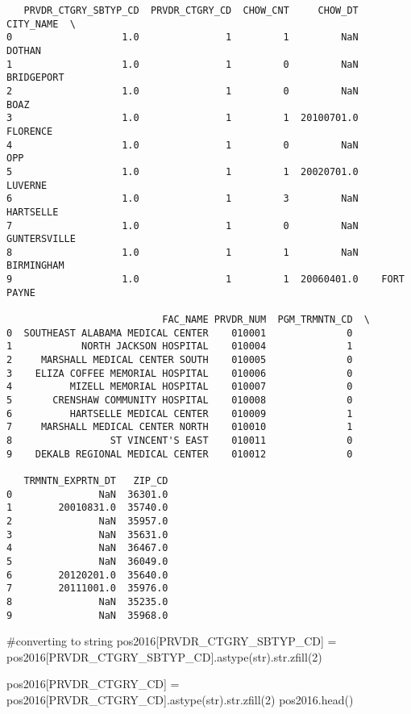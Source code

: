\documentclass[
  letterpaper,
  DIV=11,
  numbers=noendperiod]{scrartcl}
\newenvironment{Shaded}{\begin{snugshade}}{\end{snugshade}}
\newcommand{\BuiltInTok}[1]{\textcolor[rgb]{0.00,0.23,0.31}{#1}}
\newcommand{\CommentTok}[1]{\textcolor[rgb]{0.37,0.37,0.37}{#1}}
\newcommand{\DecValTok}[1]{\textcolor[rgb]{0.68,0.00,0.00}{#1}}
\newcommand{\NormalTok}[1]{\textcolor[rgb]{0.00,0.23,0.31}{#1}}
\newcommand{\OperatorTok}[1]{\textcolor[rgb]{0.37,0.37,0.37}{#1}}
\newcommand{\StringTok}[1]{\textcolor[rgb]{0.13,0.47,0.30}{#1}}
\begin{document}
\begin{verbatim}
   PRVDR_CTGRY_SBTYP_CD  PRVDR_CTGRY_CD  CHOW_CNT     CHOW_DT     CITY_NAME  \
0                   1.0               1         1         NaN        DOTHAN   
1                   1.0               1         0         NaN    BRIDGEPORT   
2                   1.0               1         0         NaN          BOAZ   
3                   1.0               1         1  20100701.0      FLORENCE   
4                   1.0               1         0         NaN           OPP   
5                   1.0               1         1  20020701.0       LUVERNE   
6                   1.0               1         3         NaN     HARTSELLE   
7                   1.0               1         0         NaN  GUNTERSVILLE   
8                   1.0               1         1         NaN    BIRMINGHAM   
9                   1.0               1         1  20060401.0    FORT PAYNE   

                           FAC_NAME PRVDR_NUM  PGM_TRMNTN_CD  \
0  SOUTHEAST ALABAMA MEDICAL CENTER    010001              0   
1            NORTH JACKSON HOSPITAL    010004              1   
2     MARSHALL MEDICAL CENTER SOUTH    010005              0   
3    ELIZA COFFEE MEMORIAL HOSPITAL    010006              0   
4          MIZELL MEMORIAL HOSPITAL    010007              0   
5       CRENSHAW COMMUNITY HOSPITAL    010008              0   
6          HARTSELLE MEDICAL CENTER    010009              1   
7     MARSHALL MEDICAL CENTER NORTH    010010              1   
8                 ST VINCENT'S EAST    010011              0   
9    DEKALB REGIONAL MEDICAL CENTER    010012              0   

   TRMNTN_EXPRTN_DT   ZIP_CD  
0               NaN  36301.0  
1        20010831.0  35740.0  
2               NaN  35957.0  
3               NaN  35631.0  
4               NaN  36467.0  
5               NaN  36049.0  
6        20120201.0  35640.0  
7        20111001.0  35976.0  
8               NaN  35235.0  
9               NaN  35968.0  
\end{verbatim}

\begin{Shaded}
\begin{Highlighting}[]
\CommentTok{\#converting to string}
\NormalTok{pos2016[}\StringTok{\textquotesingle{}PRVDR\_CTGRY\_SBTYP\_CD\textquotesingle{}}\NormalTok{] }\OperatorTok{=}\NormalTok{ pos2016[}\StringTok{\textquotesingle{}PRVDR\_CTGRY\_SBTYP\_CD\textquotesingle{}}\NormalTok{].astype(}\BuiltInTok{str}\NormalTok{).}\BuiltInTok{str}\NormalTok{.zfill(}\DecValTok{2}\NormalTok{)}

\NormalTok{pos2016[}\StringTok{\textquotesingle{}PRVDR\_CTGRY\_CD\textquotesingle{}}\NormalTok{] }\OperatorTok{=}\NormalTok{ pos2016[}\StringTok{\textquotesingle{}PRVDR\_CTGRY\_CD\textquotesingle{}}\NormalTok{].astype(}\BuiltInTok{str}\NormalTok{).}\BuiltInTok{str}\NormalTok{.zfill(}\DecValTok{2}\NormalTok{)}
\NormalTok{pos2016.head()}
\end{Highlighting}
\end{Shaded}
\end{document}
